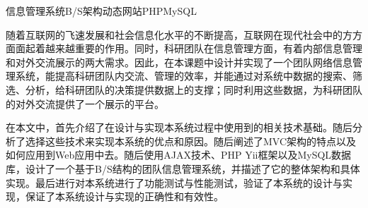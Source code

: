 \begin{Cabstract}{信息管理系统}{B/S架构}{动态网站}{PHP}{MySQL}

随着互联网的飞速发展和社会信息化水平的不断提高，互联网在现代社会中的方方面面起着越来越重要的作用。同时，科研团队在信息管理方面，有着内部信息管理和对外交流展示的两大需求。因此，在本课题中设计并实现了一个团队网络信息管理系统，能提高科研团队内交流、管理的效率，并能通过对系统中数据的搜索、筛选、分析，给科研团队的决策提供数据上的支撑；同时利用这些数据，为科研团队的对外交流提供了一个展示的平台。

在本文中，首先介绍了在设计与实现本系统过程中使用到的相关技术基础。随后分析了选择这些技术来实现本系统的优点和原因。随后阐述了MVC架构的特点以及如何应用到Web应用中去。随后使用AJAX技术、PHP Yii框架以及MySQL数据库，设计了一个基于B/S结构的团队信息管理系统，并描述了它的整体架构和具体实现。最后进行对本系统进行了功能测试与性能测试，验证了本系统的设计与实现，保证了本系统设计与实现的正确性和有效性。
\end{Cabstract}